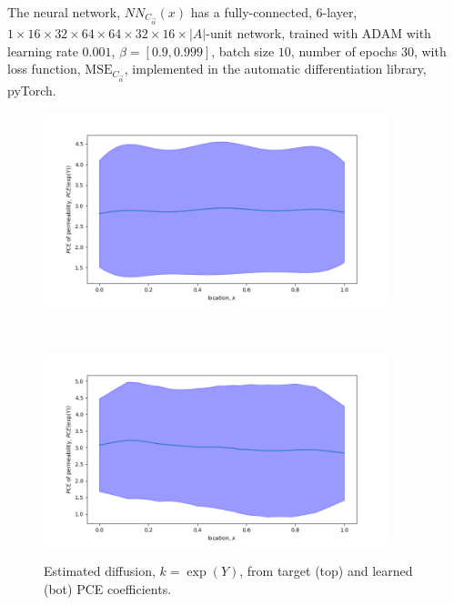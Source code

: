 \documentclass[letterpaper, 10 pt, conference, twocolumn]{ieeeconf}  %
\begin{document}
The neural network, $NN_{C_{\vec\alpha}}(x)$ has a fully-connected, 6-layer, $1\times 16\times 32\times 64\times 64\times 32\times 16 \times \lvert A \rvert$-unit network, trained with ADAM with learning rate $0.001$, $\beta=[0.9,0.999]$, batch size $10$, number of epochs $30$, with loss function, $\text{MSE}_{C_{\vec\alpha}}$, implemented in the automatic differentiation library, pyTorch.
\begin{figure}[t]
    \centering
    \begin{minipage}[b]{0.7\linewidth}
    \centering\includegraphics [trim=0 0 0 0, clip, width=0.9\textwidth, angle = 0]{figures/pce_poly_deg_3/pce_exp_of_y}
    \label{fig:target_k}
    \end{minipage}%
    \\
    \begin{minipage}[b]{0.7\linewidth}
    \centering\includegraphics [trim=0 0 0 0, clip, width=0.9\textwidth, angle = 0]{figures/est_pce_coefs_nn/pce_exp_of_y}
    \label{fig:nn_k}
    \end{minipage}%
\caption{Estimated diffusion, $k=\exp(Y)$, from target (top) and learned (bot) PCE coefficients.}
\label{fig:k}
\end{figure}
\end{document}
